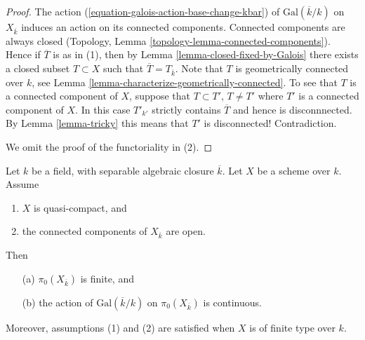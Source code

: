 \begin{proof}
The action (\ref{equation-galois-action-base-change-kbar})
of $\text{Gal}(\overline{k}/k)$ on $X_{\overline{k}}$
induces an action on its connected components.
Connected components are always closed
(Topology, Lemma \ref{topology-lemma-connected-components}).
Hence if $\overline{T}$ is as in (1), then by
Lemma \ref{lemma-closed-fixed-by-Galois} there exists a closed
subset $T \subset X$ such that $\overline{T} = T_{\overline{k}}$.
Note that $T$ is geometrically connected over $k$, see
Lemma \ref{lemma-characterize-geometrically-connected}.
To see that $T$ is a connected component of $X$, suppose that
$T \subset T'$, $T \not = T'$ where $T'$ is a connected component of $X$.
In this case $T'_{k'}$ strictly contains $\overline{T}$ and hence is
disconnnected. By Lemma \ref{lemma-tricky} this means that $T'$ is
disconnected! Contradiction.

\medskip\noindent
We omit the proof of the functoriality in (2).
\end{proof}

\begin{lemma}
\label{lemma-galois-action-connected-components-continuous}
Let $k$ be a field, with separable algebraic closure $\overline{k}$.
Let $X$ be a scheme over $k$.
Assume
\begin{enumerate}
\item $X$ is quasi-compact, and
\item the connected components of $X_{\overline{k}}$ are open.
\end{enumerate}
Then
\begin{enumerate}
\item[(a)] $\pi_0(X_{\overline{k}})$ is finite, and
\item[(b)] the action of $\text{Gal}(\overline{k}/k)$ on
$\pi_0(X_{\overline{k}})$ is continuous.
\end{enumerate}
Moreover, assumptions (1) and (2) are satisfied when $X$ is
of finite type over $k$.
\end{lemma}

